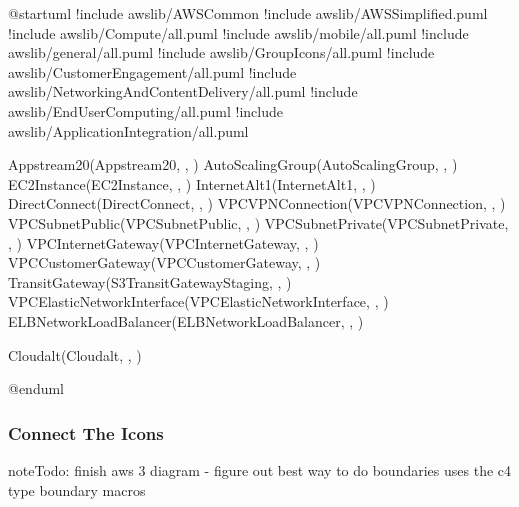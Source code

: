\documentclass[letterpaper,10pt,english]{sphinxmanual}
\begin{document}
\begin{sphinxVerbatim}[commandchars=\\\{\},numbers=left,firstnumber=1,stepnumber=1]
@startuml
!include \PYGZlt{}awslib/AWSCommon\PYGZgt{}
!include \PYGZlt{}awslib/AWSSimplified.puml\PYGZgt{}
!include \PYGZlt{}awslib/Compute/all.puml\PYGZgt{}
!include \PYGZlt{}awslib/mobile/all.puml\PYGZgt{}
!include \PYGZlt{}awslib/general/all.puml\PYGZgt{}
!include \PYGZlt{}awslib/GroupIcons/all.puml\PYGZgt{}
!include \PYGZlt{}awslib/CustomerEngagement/all.puml\PYGZgt{}
!include \PYGZlt{}awslib/NetworkingAndContentDelivery/all.puml\PYGZgt{}
!include \PYGZlt{}awslib/EndUserComputing/all.puml\PYGZgt{}
!include \PYGZlt{}awslib/ApplicationIntegration/all.puml\PYGZgt{}


Appstream2\PYGZus{}0(Appstream2\PYGZus{}0, \PYGZdq{} \PYGZdq{}, \PYGZdq{} \PYGZdq{})
AutoScalingGroup(AutoScalingGroup, \PYGZdq{} \PYGZdq{}, \PYGZdq{} \PYGZdq{})
EC2Instance(EC2Instance, \PYGZdq{} \PYGZdq{}, \PYGZdq{} \PYGZdq{})
InternetAlt1(InternetAlt1, \PYGZdq{} \PYGZdq{}, \PYGZdq{} \PYGZdq{})
DirectConnect(DirectConnect, \PYGZdq{} \PYGZdq{}, \PYGZdq{} \PYGZdq{})
VPCVPNConnection(VPCVPNConnection, \PYGZdq{} \PYGZdq{}, \PYGZdq{} \PYGZdq{})
VPCSubnetPublic(VPCSubnetPublic, \PYGZdq{} \PYGZdq{}, \PYGZdq{} \PYGZdq{})
VPCSubnetPrivate(VPCSubnetPrivate, \PYGZdq{} \PYGZdq{}, \PYGZdq{} \PYGZdq{})
VPCInternetGateway(VPCInternetGateway, \PYGZdq{} \PYGZdq{}, \PYGZdq{} \PYGZdq{})
VPCCustomerGateway(VPCCustomerGateway, \PYGZdq{} \PYGZdq{}, \PYGZdq{} \PYGZdq{})
TransitGateway(S3TransitGatewayStaging, \PYGZdq{} \PYGZdq{}, \PYGZdq{} \PYGZdq{})
VPCElasticNetworkInterface(VPCElasticNetworkInterface, \PYGZdq{} \PYGZdq{}, \PYGZdq{} \PYGZdq{})
ELBNetworkLoadBalancer(ELBNetworkLoadBalancer, \PYGZdq{} \PYGZdq{}, \PYGZdq{} \PYGZdq{})

Cloudalt(Cloudalt, \PYGZdq{} \PYGZdq{}, \PYGZdq{} \PYGZdq{})

@enduml
\end{sphinxVerbatim}


\subsubsection{Connect The Icons}
\label{\detokenize{aws/aws:id16}}
\begin{sphinxadmonition}{note}{\label{\detokenize{aws/aws:id17}}Todo:}
finish aws 3 diagram - figure out best way to do boundaries
 uses the c4 type boundary macros
\end{sphinxadmonition}
\end{document}
